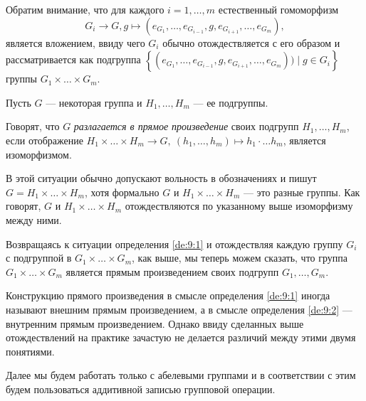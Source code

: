 \begin{comment}
    1) Группа $G_1 \times \ldots \times_m$ абелева тогда и только тогда,
    когда все группы $G_1, \ldots , G_m$ абелевы.

    2) Если группы $G_1, \ldots , G_m$ конечны, то 
    $|G_1 \times \ldots \times G_m| = |G_1| \cdot \ldots \cdot |G_m|$.
\end{comment}

Обратим внимание, что для каждого $i = 1, \ldots , m$ естественный
гомоморфизм
\[
    G_i \to G, 
    g \mapsto (e_{G_1}, \ldots , e_{G_{i - 1}}, g, e_{G_{i + 1}}, \ldots, e_{G_m}),
\]
является вложением, ввиду чего $G_i$ обычно отождествляется с его образом и
рассматривается как подгруппа 
$\left\{ (e_{G_1}, \ldots ,  e_{G_{i - 1}}, g, e_{G_{i + 1}}, \ldots, e_{G_m}))
\mid g \in G_i \right\}$ группы $G_1 \times \ldots \times G_m$.

Пусть $G$ --- некоторая группа и $H_1, \ldots , H_m$ --- ее подгруппы.

\begin{definition}\label{de:9:2}
    Говорят, что $G$ \textit{разлагается в прямое произведение} своих
    подгрупп $H_1, \ldots , H_m$, если отображение
    $H_1 \times \ldots \times H_m \to G, \ 
    (h_1, \ldots , h_m) \mapsto h_1 \cdot \ldots h_m$, является изоморфизмом.
\end{definition}

В этой ситуации обычно допускают вольность в обозначениях и пишут
$G = H_1 \times \ldots \times H_m$, хотя формально $G$ и
$H_1 \times \ldots \times H_m$ --- это разные группы.
Как говорят, $G$ и $H_1 \times \ldots  \times H_m$ отождествляются
по указанному выше изоморфизму между ними.

Возвращаясь к ситуации определения \ref{de:9:1} и отождествляя
каждую группу $G_i$ с подгруппой в $G_1 \times \ldots \times G_m$,
как выше, мы теперь можем сказать, что группа $G_1 \times \ldots \times G_m$
является прямым произведением своих подгрупп $G_1, \ldots , G_m$.

Конструкцию прямого произведения в смысле определения
\ref{de:9:1} иногда называют внешним прямым произведением,
а в смысле определения \ref{de:9:2} --- 
внутренним прямым произведением.
Однако ввиду сделанных выше отождествлений на практике 
зачастую не делается различий между этими двумя понятиями.

Далее мы будем работать только с абелевыми группами и в соответствии
с этим будем пользоваться аддитивной записью групповой операции.

